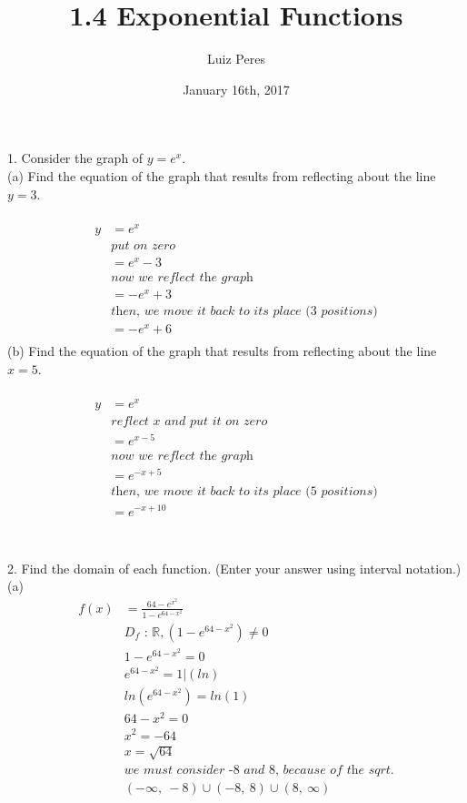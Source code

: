 \documentclass{article}
\title{1.4 Exponential Functions}
\author{Luiz Peres}
\date{January 16th, 2017}
\begin{document}
\maketitle

1. Consider the graph of $y=e^x$.\\
(a) Find the equation of the graph that results from reflecting about the line $y = 3$.\\\\
\begin{equation}
\begin{split}
    y & = e^x\\
    & \textit{put on zero}\\
    & = e^x - 3 \\
    & \textit{now we reflect the graph}\\
    & = -e^x + 3\\
    & \textit{then, we move it back to its place (3 positions)}\\
    & = -e^x + 6\\
\end{split}
\end{equation}
(b) Find the equation of the graph that results from reflecting about the line $x = 5$.\\\\
\begin{equation}
\begin{split}
    y & = e^x\\
    & \textit{reflect x and put it on zero}\\
    & = e^{x - 5} \\
    & \textit{now we reflect the graph}\\
    & = e^{-x + 5}\\
    & \textit{then, we move it back to its place (5 positions)}\\
    & = e^{-x + 10}\\
\end{split}
\end{equation}
\\\\
2. Find the domain of each function. (Enter your answer using interval notation.)\\
(a)\\
\begin{equation}
\begin{split}
    f(x) & = \frac{64 - e^{x^2}}{1 - e^{64-x^2}}\\
    & D_f\textit{ :  $\mathbb{R}, (1 - e^{64-x^2}) \neq 0$}\\
    & 1 - e^{64-x^2} = 0\\
    & e^{64-x^2} = 1 | (ln)\\
    & ln(e^{64-x^2}) = ln(1)\\
    & 64 - x^2 = 0\\
    & x^2 = -64\\
    & x = \sqrt{64}\\
	&\textit{we must consider -8 and 8, because of the sqrt.}\\
	&\left(-\infty ,\ -8\right)\cup \left(-8,\ 8\right)\cup \left(8,\ \infty \right)    
\end{split}
\end{equation}
\end{document}
